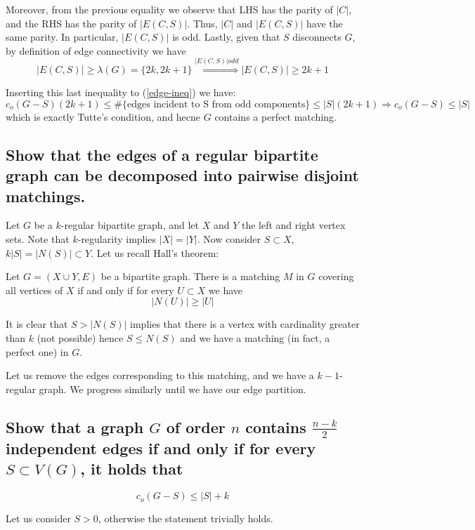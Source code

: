 Moreover, from the previous equality we observe that LHS has the parity of $|C|$, and the RHS has the parity of $|E(C,S)|$. Thus, $|C|$ and $|E(C,S)|$ have the same parity. In particular, $|E(C,S)|$ is odd. Lastly, given that $S$ disconnects $G$, by definition of edge connectivity we have
$$|E(C,S)| \geq \lambda(G) = \lbrace 2k, 2k + 1 \rbrace \overset{|E(C,S)| odd}{\Longrightarrow} |E(C,S)| \geq 2k + 1$$

Inserting this last inequality to (\ref{edge-ineq}) we have:
$$c_o(G-S)(2k + 1) \leq \#\lbrace\text{edges incident to S from odd components}\rbrace \leq |S|(2k + 1) \Rightarrow c_o(G-S) \leq |S|$$
which is exactly Tutte's condition, and hecne $G$ contains a perfect matching.

\newpage

\subsection[Matchings 3]{Show that the edges of a regular bipartite graph can be decomposed into pairwise disjoint matchings.}

Let $G$ be a $k$-regular bipartite graph, and let $X$ and $Y$ the left and right vertex sets.
Note that $k$-regularity implies $|X| = |Y|$.
Now consider $S \subset X$, $k|S| = |N(S)| \subset Y$.
Let us recall Hall's theorem:
\begin{theorem}[Hall]
    Let $G = (X \cup Y, E)$ be a bipartite graph.
    There is a matching $M$ in $G$ covering all vertices of $X$ if and only if for every $U \subset X$ we have
    $$ |N(U)| \geq |U| $$
\end{theorem}
It is clear that $S > |N(S)|$ implies that there is a vertex with cardinality greater than $k$ (not possible) hence $S \leq N(S)$ and we have a matching (in fact, a perfect one) in $G$.

Let us remove the edges corresponding to this matching, and we have a $k-1$-regular graph.
We progress similarly until we have our edge partition.

\newpage

\subsection[Matchings 6]{Show that a graph $G$ of order $n$ contains $\frac{n-k}{2}$ independent edges if and only if for every $S \subset V(G)$, it holds that}
$$c_o(G-S) \leq |S| + k$$

Let us consider $S > 0$, otherwise the statement trivially holds.

